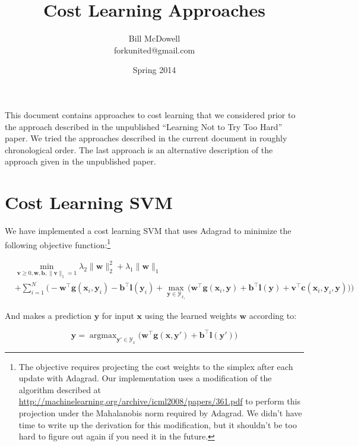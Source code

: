 \documentclass[11pt,letterpaper]{article}
\title{Cost Learning Approaches}
\author{Bill McDowell \\ forkunited@gmail.com}
\date{Spring 2014}
\DeclareMathOperator*{\argmax}{argmax}
\begin{document}
\maketitle

This document contains approaches to cost learning that
we considered prior to the approach described in the 
unpublished ``Learning Not to Try Too Hard'' paper.  We
tried the approaches described in the current document
in roughly chronological order.  The last approach
is an alternative description of the approach given
in the unpublished paper. 

\section{Cost Learning SVM}

We have implemented a cost learning SVM that uses Adagrad to minimize the 
following objective function:\footnote{
The objective requires projecting the cost weights to the simplex after each
update with Adagrad.  Our implementation uses a modification of
the algorithm described at 
\url{http://machinelearning.org/archive/icml2008/papers/361.pdf}
to perform this projection under the Mahalanobis norm required by
Adagrad.  We didn't have time to write up the derivation for this
modification, but it shouldn't be too hard to figure out again if 
you need it in the future.}

\begin{equation}
\begin{split}
\label{objective}
& \min_{\mathbf{v}\geq 0, \mathbf{w},  \mathbf{b}, \|\mathbf{v}\|_1 = 1} \lambda_2\|\mathbf{w}\|_2^2+\lambda_1\|\mathbf{w}\|_1 \\
 & +\sum_{i=1}^N\bigg(-\mathbf{w}^\top \mathbf{g}(\mathbf{x}_i,\mathbf{y}_i)-\mathbf{b}^\top \mathbf{l}(\mathbf{y}_i)+\max_{\mathbf{y}\in \mathcal{Y}_{x_i}}\Big(\mathbf{w}^\top\mathbf{g}(\mathbf{x}_i,\mathbf{y})+\mathbf{b}^\top \mathbf{l}(\mathbf{y})+\mathbf{v}^\top\mathbf{c}(\mathbf{x}_i,\mathbf{y}_i,\mathbf{y})\Big)\bigg)
\end{split}
\end{equation}

And makes a prediction $\mathbf{y}$ for input $\mathbf{x}$ using the learned
weights $\mathbf{w}$ according to:

\begin{equation}
\label{prediction}
\mathbf{y}=\argmax_{\mathbf{y}'\in\mathcal{Y}_x}\Big( \mathbf{w}^\top \mathbf{g}(\mathbf{x},\mathbf{y}')+\mathbf{b}^\top\mathbf{l}(\mathbf{y}') \Big)
\end{equation}
\end{document}
